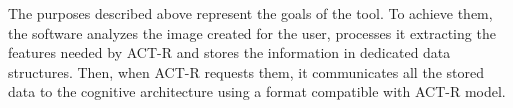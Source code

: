 	
	The purposes described above represent the goals of the tool.
	To achieve them, the software analyzes the image created for the user, processes it extracting the features needed by \mbox{ACT-R} and stores the information in dedicated data structures. Then, when \mbox{ACT-R} requests them, it communicates all the stored data to the cognitive architecture using a format compatible with \mbox{ACT-R} model. 
	

